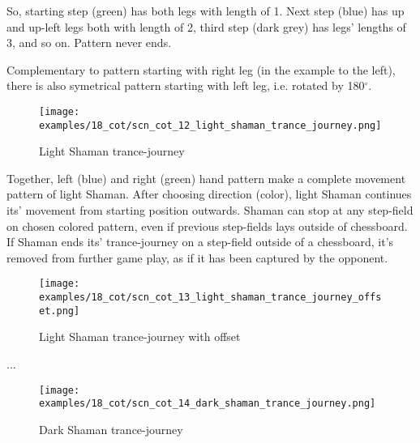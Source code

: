 So, starting step (green) has both legs with length of 1. Next step (blue) has up and up-left
legs both with length of 2, third step (dark grey) has legs' lengths of 3, and so on. Pattern
never ends.

Complementary to pattern starting with right leg (in the example to the left), there is also
symetrical pattern starting with left leg, i.e. rotated by 180$^{\circ}$. %

\clearpage %

\noindent
\begin{figure}[!h]
\texttt{[image: examples/18\_cot/scn\_cot\_12\_light\_shaman\_trance\_journey.png]}
\caption{Light Shaman trance-journey}
\label{fig:scn_cot_12_light_shaman_trance_journey}
\end{figure}

Together, left (blue) and right (green) hand pattern make a complete movement pattern of light
Shaman. After choosing direction (color), light Shaman continues its' movement from starting
position outwards. Shaman can stop at any step-field on chosen colored pattern, even if previous
step-fields lays outside of chessboard. If Shaman ends its' trance-journey on a step-field outside
of a chessboard, it's removed from further game play, as if it has been captured by the opponent.

\clearpage %

\noindent
\begin{figure}[!h]
\texttt{[image: examples/18\_cot/scn\_cot\_13\_light\_shaman\_trance\_journey\_offset.png]}
\caption{Light Shaman trance-journey with offset}
\label{fig:scn_cot_13_light_shaman_trance_journey_offset}
\end{figure}

...


\clearpage %

\noindent
\begin{figure}[!h]
\texttt{[image: examples/18\_cot/scn\_cot\_14\_dark\_shaman\_trance\_journey.png]}
\caption{Dark Shaman trance-journey}
\label{fig:scn_cot_14_dark_shaman_trance_journey}
\end{figure}

